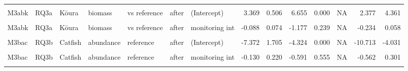 \documentclass[
  12pt,
  a4paper,
  oneside]{scrbook}
\begin{document}
\begin{landscape}
\begin{longtable}[t]{lllllllrrrrrrr}
\addlinespace
\cellcolor{gray!8}{M3aak} & \cellcolor{gray!8}{RQ3a} & \cellcolor{gray!8}{Kōura} & \cellcolor{gray!8}{abundance} & \cellcolor{gray!8}{vs reference} & \cellcolor{gray!8}{after} & \cellcolor{gray!8}{siteStone pile:monitoring int} & \cellcolor{gray!8}{-0.086} & \cellcolor{gray!8}{0.109} & \cellcolor{gray!8}{-0.791} & \cellcolor{gray!8}{0.429} & \cellcolor{gray!8}{0.572} & \cellcolor{gray!8}{-0.299} & \cellcolor{gray!8}{0.127}\\
M3abk & RQ3a & Kōura & biomass & vs reference & after & (Intercept) & 3.369 & 0.506 & 6.655 & 0.000 & NA & 2.377 & 4.361\\
\cellcolor{gray!8}{M3abk} & \cellcolor{gray!8}{RQ3a} & \cellcolor{gray!8}{Kōura} & \cellcolor{gray!8}{biomass} & \cellcolor{gray!8}{vs reference} & \cellcolor{gray!8}{after} & \cellcolor{gray!8}{siteStone pile} & \cellcolor{gray!8}{-0.149} & \cellcolor{gray!8}{0.885} & \cellcolor{gray!8}{-0.168} & \cellcolor{gray!8}{0.866} & \cellcolor{gray!8}{NA} & \cellcolor{gray!8}{-1.884} & \cellcolor{gray!8}{1.586}\\
M3abk & RQ3a & Kōura & biomass & vs reference & after & monitoring int & -0.088 & 0.074 & -1.177 & 0.239 & NA & -0.234 & 0.058\\
\cellcolor{gray!8}{M3abk} & \cellcolor{gray!8}{RQ3a} & \cellcolor{gray!8}{Kōura} & \cellcolor{gray!8}{biomass} & \cellcolor{gray!8}{vs reference} & \cellcolor{gray!8}{after} & \cellcolor{gray!8}{siteStone pile:monitoring int} & \cellcolor{gray!8}{0.016} & \cellcolor{gray!8}{0.142} & \cellcolor{gray!8}{0.112} & \cellcolor{gray!8}{0.911} & \cellcolor{gray!8}{0.911} & \cellcolor{gray!8}{-0.262} & \cellcolor{gray!8}{0.294}\\
\addlinespace
M3bac & RQ3b & Catfish & abundance & reference & after & (Intercept) & -7.372 & 1.705 & -4.324 & 0.000 & NA & -10.713 & -4.031\\
\cellcolor{gray!8}{M3bac} & \cellcolor{gray!8}{RQ3b} & \cellcolor{gray!8}{Catfish} & \cellcolor{gray!8}{abundance} & \cellcolor{gray!8}{reference} & \cellcolor{gray!8}{after} & \cellcolor{gray!8}{Site type detailReference 2} & \cellcolor{gray!8}{0.753} & \cellcolor{gray!8}{1.007} & \cellcolor{gray!8}{0.747} & \cellcolor{gray!8}{0.455} & \cellcolor{gray!8}{NA} & \cellcolor{gray!8}{-1.221} & \cellcolor{gray!8}{2.726}\\
M3bac & RQ3b & Catfish & abundance & reference & after & monitoring int & -0.130 & 0.220 & -0.591 & 0.555 & NA & -0.562 & 0.301\\
\cellcolor{gray!8}{M3bac} & \cellcolor{gray!8}{RQ3b} & \cellcolor{gray!8}{Catfish} & \cellcolor{gray!8}{abundance} & \cellcolor{gray!8}{reference} & \cellcolor{gray!8}{after} & \cellcolor{gray!8}{Temperature} & \cellcolor{gray!8}{0.304} & \cellcolor{gray!8}{0.073} & \cellcolor{gray!8}{4.183} & \cellcolor{gray!8}{0.000} & \cellcolor{gray!8}{NA} & \cellcolor{gray!8}{0.161} & \cellcolor{gray!8}{0.446}\\

\end{longtable}
\end{landscape}
\end{document}
